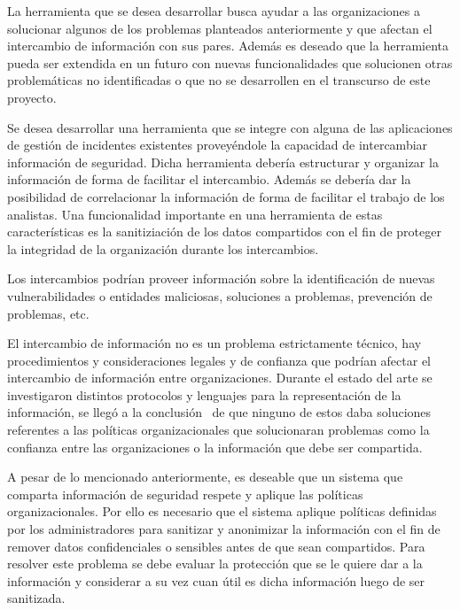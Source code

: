 {
	La herramienta que se desea desarrollar busca ayudar a las organizaciones a solucionar algunos de los problemas
	planteados anteriormente y que afectan el intercambio de información con sus pares. Además es deseado que la
	herramienta pueda ser extendida en un futuro con nuevas funcionalidades que solucionen otras problemáticas no
	identificadas o que no se desarrollen en el transcurso de este proyecto.}


\bigskip

{
	Se desea desarrollar una herramienta que se integre con alguna de las aplicaciones de gestión de incidentes existentes
	proveyéndole la capacidad de intercambiar información de seguridad. Dicha herramienta debería estructurar y organizar
	la información de forma de facilitar el intercambio. Además se debería dar la posibilidad de correlacionar la
	información de forma de facilitar el trabajo de los analistas. Una funcionalidad importante en una herramienta de estas
	características es la sanitiziación de los datos compartidos con el fin de proteger la integridad de la organización
	durante los intercambios.}


\bigskip

{
	Los intercambios podrían proveer información sobre la identificación de nuevas vulnerabilidades o entidades maliciosas,
	soluciones a problemas, prevención de problemas, etc. }


\bigskip

{
	El intercambio de información no es un problema estrictamente técnico, hay procedimientos y consideraciones legales y de
	confianza que podrían afectar el intercambio de información entre organizaciones. Durante el estado del arte se
	investigaron distintos protocolos y lenguajes para la representación de la información, se llegó a la conclusión \ de
	que ninguno de estos daba soluciones referentes a las políticas organizacionales que solucionaran problemas como la
	confianza entre las organizaciones o la información que debe ser compartida.}


\bigskip

{
	A pesar de lo mencionado anteriormente, es deseable que un sistema que comparta información de seguridad respete y
	aplique las políticas organizacionales. Por ello es necesario que el sistema aplique políticas definidas por los
	administradores para sanitizar y anonimizar la información con el fin de remover datos confidenciales o sensibles antes
	de que sean compartidos. Para resolver este problema se debe evaluar la protección que se le quiere dar a la
	información y considerar a su vez cuan útil es dicha información luego de ser sanitizada.}

